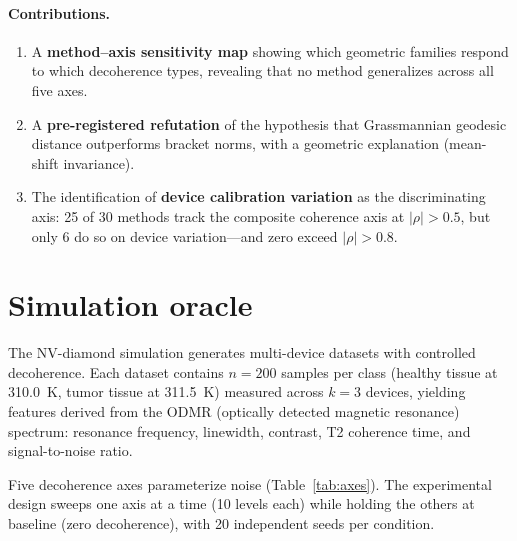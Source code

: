 \documentclass[11pt]{article}
\begin{document}
\paragraph{Contributions.}
\begin{enumerate}
  \item A \textbf{method--axis sensitivity map} showing which geometric
    families respond to which decoherence types, revealing that no method
    generalizes across all five axes.
  \item A \textbf{pre-registered refutation} of the hypothesis that
    Grassmannian geodesic distance outperforms bracket norms, with a
    geometric explanation (mean-shift invariance).
  \item The identification of \textbf{device calibration variation} as
    the discriminating axis: 25 of 30 methods track the composite
    coherence axis at $|\rho| > 0.5$, but only 6 do so on device
    variation---and zero exceed $|\rho| > 0.8$.
\end{enumerate}

\section{Simulation oracle}
\label{sec:oracle}

The NV-diamond simulation generates multi-device datasets with controlled
decoherence.  Each dataset contains $n = 200$ samples per class (healthy
tissue at 310.0~K, tumor tissue at 311.5~K) measured across $k = 3$
devices, yielding features derived from the ODMR (optically detected
magnetic resonance) spectrum: resonance frequency, linewidth, contrast,
T2 coherence time, and signal-to-noise ratio.

Five decoherence axes parameterize noise (Table~\ref{tab:axes}).  The
experimental design sweeps one axis at a time (10 levels each) while
holding the others at baseline (zero decoherence), with 20 independent
seeds per condition.
\end{document}
